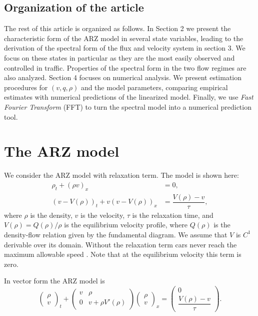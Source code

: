 \documentclass[preprint]{elsarticle}
\begin{document}
\subsection{Organization of the article}
The rest of this article is organized as follows. In Section 2 we present the characteristic form of the ARZ model in several state variables, leading to the derivation of the spectral form of the flux and velocity system in section 3. We focus on these states in particular as they are the most easily observed and controlled in traffic. Properties of the spectral form in the two flow regimes are also analyzed. Section 4 focuses on numerical analysis. We present estimation procedures for $(v,q,\rho)$ and the model parameters, comparing empirical estimates with numerical predictions of the linearized model. Finally, we use \textit{Fast Fourier Transform} (FFT) to turn the spectral model into a numerical prediction tool.


\section{The ARZ model} \label{ARZSection}


We consider the ARZ model with relaxation term. The model is shown here: 
\begin{align} 
\rho_t + (\rho v)_x &= 0, \label{ARZ1} \\
(v - V(\rho))_t + v(v - V(\rho))_x &=\dfrac{V(\rho) - v}{\tau} \label{ARZ2},
\end{align}
where $\rho$ is the density, $v$ is the velocity, $\tau$ is the relaxation time, and $V(\rho) = Q(\rho)/\rho$ is the equilibrium velocity profile, where $Q(\rho)$ is the density-flow relation given by the fundamental diagram. We assume that $V$ is $C^{1}$ derivable over its domain. Without the relaxation term cars never reach the maximum allowable speed \cite{R_improved}. Note that at the equilibrium velocity this term is zero. 

In vector form the ARZ model is
\begin{equation} \label{ARZrhov}
\begin{pmatrix}
\rho \\ v
\end{pmatrix}_t
+ \begin{pmatrix}
v & \rho \\
0 & v + \rho V' (\rho)
\end{pmatrix}
\begin{pmatrix}
\rho \\ v
\end{pmatrix}_x = 
\begin{pmatrix}
0 \\ \dfrac{V(\rho) - v}{\tau}
\end{pmatrix}.
\end{equation}
\end{document}
